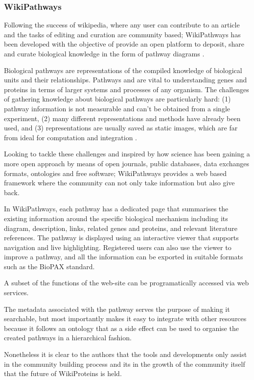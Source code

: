\subsubsection{WikiPathways}
Following the success of wikipedia, where any user can contribute to an article and the tasks of editing and curation are community based; WikiPathways has been developed with the objective of provide an open platform to deposit, share and curate biological knowledge in the form of pathway diagrams \cite{KEL2012}.

Biological pathways are representations of the compiled knowledge of biological units and their relationships. Pathways and are vital to understanding genes and proteins in terms of larger systems and processes of any organism. The challenges of gathering knowledge about biological pathways are particularly hard: (1) pathway information is not measurable and can't be obtained from a single experiment, (2) many different representations and methods have already been used, and (3)  representations are usually saved as static images, which are far from ideal for computation and integration \cite{PIC2008}.

Looking to tackle these challenges and inspired by how science has been gaining a more open approach by means of open journals, public databases, data exchanges formats, ontologies and free software; WikiPathways provides a web based framework where the community can not only take information but also give back.

In WikiPathways, each pathway has a dedicated page that summarises the existing information around the specific biological mechanism including its diagram, description, links, related genes and proteins, and relevant literature references. The pathway is displayed using an interactive viewer that supports navigation and live highlighting. Registered users can also use the viewer to improve a pathway, and all the information can be exported in suitable formats such as the BioPAX standard.

A subset of the functions of the web-site can be programatically accessed via web services.

The metadata associated with the pathway serves the purpose of making it searchable, but most importantly makes it easy to integrate with other resources because it follows an ontology that as a side effect can be used to organise the created pathways in a hierarchical fashion.

Nonetheless it is clear to the authors that the tools and developments only assist in the community building process and its in the growth of the community itself that the future of WikiProteins is held.

